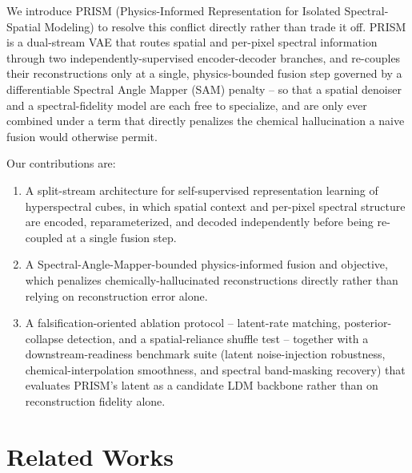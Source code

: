 \documentclass{article} %
\begin{document}
We introduce PRISM (Physics-Informed Representation for Isolated Spectral-Spatial Modeling) to resolve this conflict directly rather than trade it off. PRISM is a dual-stream VAE that routes spatial and per-pixel spectral information through two independently-supervised encoder-decoder branches, and re-couples their reconstructions only at a single, physics-bounded fusion step governed by a differentiable Spectral Angle Mapper (SAM) penalty -- so that a spatial denoiser and a spectral-fidelity model are each free to specialize, and are only ever combined under a term that directly penalizes the chemical hallucination a naive fusion would otherwise permit.

Our contributions are:
\begin{enumerate}
\item A split-stream architecture for self-supervised representation learning of hyperspectral cubes, in which spatial context and per-pixel spectral structure are encoded, reparameterized, and decoded independently before being re-coupled at a single fusion step.
\item A Spectral-Angle-Mapper-bounded physics-informed fusion and objective, which penalizes chemically-hallucinated reconstructions directly rather than relying on reconstruction error alone.
\item A falsification-oriented ablation protocol -- latent-rate matching, posterior-collapse detection, and a spatial-reliance shuffle test -- together with a downstream-readiness benchmark suite (latent noise-injection robustness, chemical-interpolation smoothness, and spectral band-masking recovery) that evaluates PRISM's latent as a candidate LDM backbone rather than on reconstruction fidelity alone.
\end{enumerate}

\section{Related Works}
\end{document}

